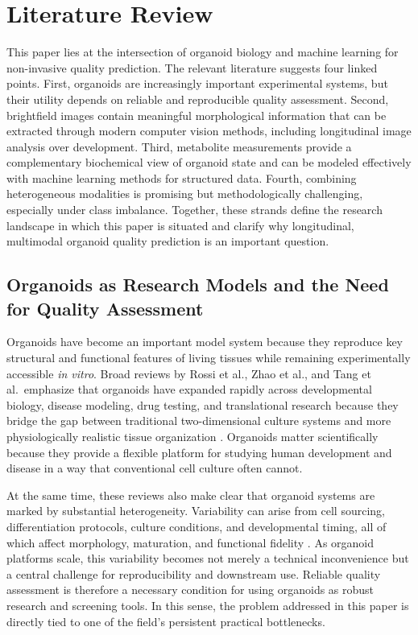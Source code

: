 \documentclass{article}
\begin{document}
\section{Literature Review}

This paper lies at the intersection of organoid biology and machine learning for non-invasive quality prediction. The relevant literature suggests four linked points. First, organoids are increasingly important experimental systems, but their utility depends on reliable and reproducible quality assessment. Second, brightfield images contain meaningful morphological information that can be extracted through modern computer vision methods, including longitudinal image analysis over development. Third, metabolite measurements provide a complementary biochemical view of organoid state and can be modeled effectively with machine learning methods for structured data. Fourth, combining heterogeneous modalities is promising but methodologically challenging, especially under class imbalance. Together, these strands define the research landscape in which this paper is situated and clarify why longitudinal, multimodal organoid quality prediction is an important question.

\subsection{Organoids as Research Models and the Need for Quality Assessment}

Organoids have become an important model system because they reproduce key structural and functional features of living tissues while remaining experimentally accessible \textit{in vitro}. Broad reviews by Rossi et al., Zhao et al., and Tang et al.\ emphasize that organoids have expanded rapidly across developmental biology, disease modeling, drug testing, and translational research because they bridge the gap between traditional two-dimensional culture systems and more physiologically realistic tissue organization \cite{rossi2018,zhao2022,tang2022}. Organoids matter scientifically because they provide a flexible platform for studying human development and disease in a way that conventional cell culture often cannot.

At the same time, these reviews also make clear that organoid systems are marked by substantial heterogeneity. Variability can arise from cell sourcing, differentiation protocols, culture conditions, and developmental timing, all of which affect morphology, maturation, and functional fidelity \cite{rossi2018,zhao2022}. As organoid platforms scale, this variability becomes not merely a technical inconvenience but a central challenge for reproducibility and downstream use. Reliable quality assessment is therefore a necessary condition for using organoids as robust research and screening tools. In this sense, the problem addressed in this paper is directly tied to one of the field's persistent practical bottlenecks.
\end{document}
